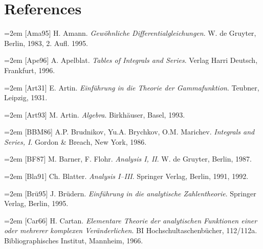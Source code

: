 \chapter*{\fontsize{23.6pt}{28.3pt}\selectfont References}

\begingroup
\setlength{\parindent}{0pt}
\raggedright

\par\hangindent=2em [Ama95] H. Amann. \emph{Gewöhnliche Differentialgleichungen}. W. de Gruyter, Berlin, 1983, 2. Aufl. 1995.\par

\par\hangindent=2em [Ape96] A. Apelblat. \emph{Tables of Integrals and Series}. Verlag Harri Deutsch, Frankfurt, 1996.\par

\par\hangindent=2em [Art31] E. Artin. \emph{Einführung in die Theorie der Gammafunktion}. Teubner, Leipzig, 1931.\par

\par\hangindent=2em [Art93] M. Artin. \emph{Algebra}. Birkhäuser, Basel, 1993.\par

\par\hangindent=2em [BBM86] A.P. Brudnikov, Yu.A. Brychkov, O.M. Marichev. \emph{Integrals and Series, I}. Gordon \& Breach, New York, 1986.\par

\par\hangindent=2em [BF87] M. Barner, F. Flohr. \emph{Analysis I, II}. W. de Gruyter, Berlin, 1987.\par

\par\hangindent=2em [Bla91] Ch. Blatter. \emph{Analysis I–III}. Springer Verlag, Berlin, 1991, 1992.\par

\par\hangindent=2em [Brü95] J. Brüdern. \emph{Einführung in die analytische Zahlentheorie}. Springer Verlag, Berlin, 1995.\par

\par\hangindent=2em [Car66] H. Cartan. \emph{Elementare Theorie der analytischen Funktionen einer oder mehrerer komplexen Veränderlichen}. BI Hochschultaschenbücher, 112/112a. Bibliographisches Institut, Mannheim, 1966.\par

